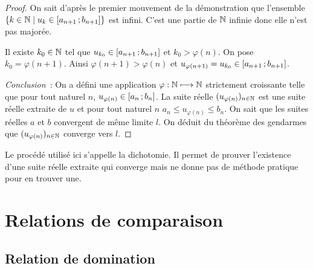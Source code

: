 \begin{proof}
On sait d'après le premier mouvement de la démonstration que l'ensemble \(\left\{k \in \mathbb{N}\mathrel{}\middle|\mathrel{}u_k \in \left[ a_{n+1} \, ;  b_{n+1} \right]\right\}\) est infini. C'est une partie de \(\mathbb{N}\) infinie donc elle n'est pas majorée.

Il existe \(k_0 \in \mathbb{N}\) tel que \(u_{k_0}\in \left[ a_{n+1} \, ;  b_{n+1} \right]\) et \(k_0 > \varphi(n)\). On pose \(k_0=\varphi(n+1)\). Ainsi \(\varphi(n+1) > \varphi(n)\) et \(u_{\varphi(n+1)}=u_{k_0}\in \left[ a_{n+1} \, ;  b_{n+1} \right]\).

\emph{Conclusion}~: On a défini une application \(\varphi : \mathbb{N} \longmapsto \mathbb{N}\) strictement croissante telle que pour tout naturel \(n\), \(u_{\varphi(n)} \in \left[ a_{n} \, ;  b_{n} \right]\). La suite réelle \((u_{\varphi(n)})_{n \in \mathbb{N}}\) est une suite réelle extraite de \(u\) et pour tout naturel \(n\) \(a_n \leqslant u_{\varphi(n)} \leqslant b_n\). On sait que les suites réelles \(a\) et \(b\) convergent de même limite \(l\). On déduit du théorème des gendarmes que \((u_{\varphi(n)})_{n \in \mathbb{N}}\) converge vers \(l\).
\end{proof}

Le procédé utilisé ici s'appelle la dichotomie. Il permet de prouver l'existence d'une suite réelle extraite qui converge mais ne donne pas de méthode pratique pour en trouver une.

\section{Relations de comparaison}

\subsection{Relation de domination}

